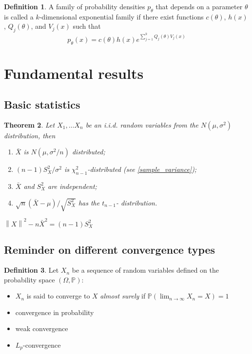 \documentclass[12pt]{article}
\newtheorem{theorem}{Theorem}[section]
\theoremstyle{definition}
\newtheorem{definition}[theorem]{Definition}
\theoremstyle{remark}
\numberwithin{equation}{section}
\newcommand{\PP}{\mathbb{P}}
\begin{document}
\begin{definition}\label{exponential_family}
	A family of probability densities $p_\theta$ that depends on a parameter $\theta$ is called a $k$-dimensional exponential family if there exist functions $c(\theta)$, $h(x)$, $Q_j(\theta)$, and $V_j(x)$ such that
	\begin{equation*}
		p_\theta(x) = c(\theta)h(x)e^{\sum_{j=1}^k Q_j(\theta)V_j(x)}
	\end{equation*}
\end{definition}

\section{Fundamental results}


\subsection{Basic statistics}

\begin{theorem}\label{normaliid}
	Let $X_1,\ldots X_n$ be an i.i.d. random variables from the $N(\mu, \sigma^2)$ distribution, then
	\begin{enumerate}
		\item $\bar X$ is $N(\mu, \sigma^2/n)$ distributed;
		\item $(n-1)S_X^2/\sigma^2$ is $\chi^2_{n-1}$-distributed (see \ref{sample_variance});
		\item $\bar X$ and $S^2_{X}$ are independent;
		\item $\sqrt{n}(\bar{X} - \mu)/\sqrt{S_X^2}$ has the $t_{n-1}$- distribution.
	\end{enumerate}
\end{theorem}
\proof $\left\|X\right\|^2 - n \bar{X}^2 = (n-1)S_X^2$


\subsection{Reminder on different convergence types}
\begin{definition}
	Let $X_n$ be a sequence of random variables defined on the probability space $\left(\Omega, \PP\right)$:
	\begin{itemize}
		\item $X_n$ is said to converge to $X$ \emph{almost surely} if $\PP(\lim_{n\rightarrow \infty}X_n = X) = 1$
		\item convergence in probability
		\item weak convergence
		\item $L_p$-convergence
	\end{itemize}
\end{definition}
\end{document}
